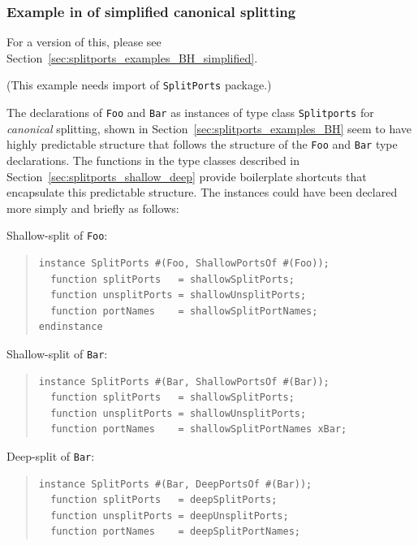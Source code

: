 
\subsubsection{Example in {\BSVb} of simplified canonical splitting}

\label{sec:splitports_examples_BSV_simplified}

{\footnotesize  For a {\BHb} version of this, please see
  Section~\ref{sec:splitports_examples_BH_simplified}.}

{\footnotesize (This example needs import of {\tt SplitPorts} package.)}

The declarations of {\tt Foo} and {\tt Bar} as instances of type class
{\tt Splitports} for \emph{canonical} splitting, shown in
Section~\ref{sec:splitports_examples_BH} seem to have highly
predictable structure that follows the structure of the {\tt Foo} and
{\tt Bar} type declarations. The functions in the type classes
described in Section~\ref{sec:splitports_shallow_deep} provide
boilerplate shortcuts that encapsulate this predictable structure.
The instances could have been declared more simply and briefly as
follows:

Shallow-split of {\tt Foo}:
\begin{quote}
\begin{verbatim}
instance SplitPorts #(Foo, ShallowPortsOf #(Foo));
  function splitPorts   = shallowSplitPorts;
  function unsplitPorts = shallowUnsplitPorts;
  function portNames    = shallowSplitPortNames;
endinstance
\end{verbatim}
\end{quote}

Shallow-split of {\tt Bar}:
\begin{quote}
\begin{verbatim}
instance SplitPorts #(Bar, ShallowPortsOf #(Bar));
  function splitPorts   = shallowSplitPorts;
  function unsplitPorts = shallowUnsplitPorts;
  function portNames    = shallowSplitPortNames xBar;
\end{verbatim}
\end{quote}

Deep-split of {\tt Bar}:
\begin{quote}
\begin{verbatim}
instance SplitPorts #(Bar, DeepPortsOf #(Bar));
  function splitPorts   = deepSplitPorts;
  function unsplitPorts = deepUnsplitPorts;
  function portNames    = deepSplitPortNames;
\end{verbatim}
\end{quote}

